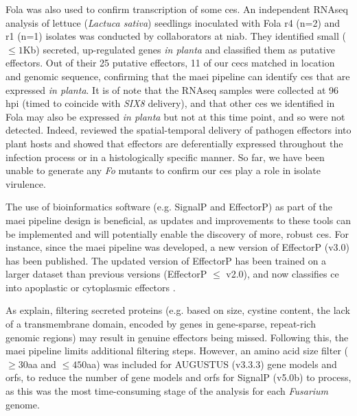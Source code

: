 \ac{Fola} was also used to confirm transcription of some \acp{ce}. An independent RNAseq analysis of lettuce (\textit{Lactuca sativa}) seedlings inoculated with \ac{Fola} \ac{r4} (n=2) and \ac{r1} (n=1) isolates was conducted by collaborators at \ac{niab}. They identified small ($\le1$Kb) secreted, up-regulated genes \textit{in planta} and classified them as putative effectors. Out of their 25 putative effectors, 11 of our \acp{cec} matched in location and genomic sequence, confirming that the \ac{maei} pipeline can identify \acp{ce} that are expressed \textit{in planta}. It is of note that the RNAseq samples were collected at 96 \ac{hpi} (timed to coincide with \textit{SIX8} delivery), and that other \acp{ce} we identified in \ac{Fola} may also be expressed \textit{in planta} but not at this time point, and so were not detected.  Indeed, \textcite{Toruno2016} reviewed the spatial-temporal delivery of pathogen effectors into plant hosts and showed that effectors are deferentially expressed throughout the infection process or in a histologically specific manner. So far, we have been unable to generate any \textit{Fo} mutants to confirm our \acp{ce} play a role in isolate virulence. 

The use of bioinformatics software (e.g. SignalP and EffectorP) as part of the \ac{maei} pipeline design is beneficial, as updates and improvements to these tools can be implemented and will potentially enable the discovery of more, robust \acp{ce}. For instance, since the \ac{maei} pipeline was developed, a new version of EffectorP (v3.0) has been published. The updated version of EffectorP has been trained on a larger dataset than previous versions (EffectorP $\le$ v2.0), and now classifies \acl{ce} into apoplastic or cytoplasmic effectors \parencite{Sperschneider2022}.  

As \textcite{LoPresti2015, Sperschneider2015} explain, filtering secreted proteins (e.g. based on size, cystine content, the lack of a transmembrane domain, encoded by genes in gene-sparse, repeat-rich genomic regions) may result in genuine effectors being missed. Following this, the \ac{maei} pipeline limits additional filtering steps. However, an amino acid size filter ($\geq30$aa and $\leq450$aa) was included for AUGUSTUS (v3.3.3) gene models and \acp{orf}, to reduce the number of gene models and \acp{orf} for SignalP (v5.0b) to process, as this was the most time-consuming stage of the analysis for each \textit{Fusarium} genome. 

